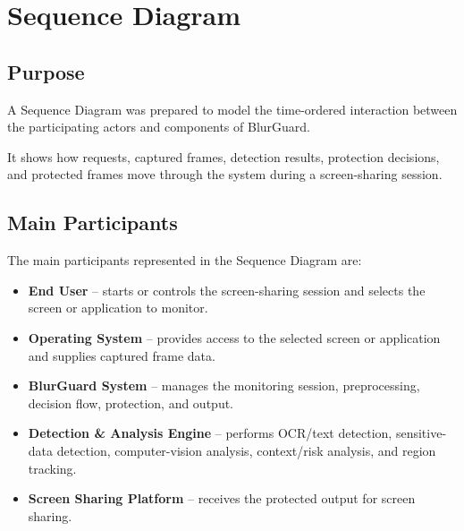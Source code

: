 \documentclass[12pt,a4paper]{article}
\begin{document}

\section{Sequence Diagram}

\subsection{Purpose}

A Sequence Diagram was prepared to model the time-ordered interaction between the participating actors and components of BlurGuard.

It shows how requests, captured frames, detection results, protection decisions, and protected frames move through the system during a screen-sharing session.

\subsection{Main Participants}

The main participants represented in the Sequence Diagram are:

\begin{itemize}[leftmargin=1.4em]

    \item \textbf{End User} -- starts or controls the screen-sharing session and selects the screen or application to monitor.

    \item \textbf{Operating System} -- provides access to the selected screen or application and supplies captured frame data.

    \item \textbf{BlurGuard System} -- manages the monitoring session, preprocessing, decision flow, protection, and output.

    \item \textbf{Detection \& Analysis Engine} -- performs OCR/text detection, sensitive-data detection, computer-vision analysis, context/risk analysis, and region tracking.

    \item \textbf{Screen Sharing Platform} -- receives the protected output for screen sharing.

\end{itemize}
\end{document}

